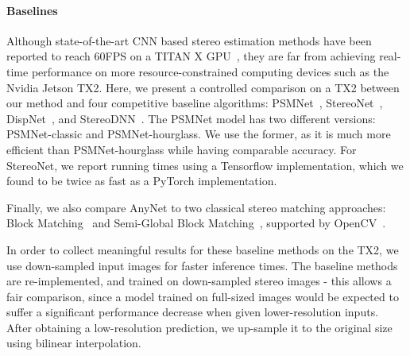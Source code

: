 \documentclass[letterpaper, 10 pt, conference]{ieeeconf}
\newcommand{\nameshort}[1]{AnyNet}
\begin{document}
\paragraph{\textbf{Baselines}} 
Although state-of-the-art CNN based stereo estimation methods have been reported to reach 60FPS on a TITAN X GPU~\cite{khamis2018stereonet}, they are far from achieving real-time performance on more resource-constrained computing devices such as the Nvidia Jetson TX2.
Here, we present a controlled comparison on a TX2 between our method and four competitive baseline algorithms: PSMNet~\cite{zhao2017pyramid}, StereoNet~\cite{khamis2018stereonet}, DispNet~\cite{mayer2016large}, and StereoDNN~\cite{smolyanskiy2018importance}. The PSMNet model has two different versions: PSMNet-classic and PSMNet-hourglass. We use the former, as it is much more efficient than PSMNet-hourglass while having comparable accuracy. For StereoNet, we report running times using a Tensorflow implementation, which we found to be twice as fast as a PyTorch implementation.

Finally, we also compare \nameshort{} to two classical stereo matching approaches: Block Matching~\cite{konolige1998small} and Semi-Global Block Matching~\cite{hirschmuller2008stereo}, supported by OpenCV~\cite{bradski2000opencv}.

In order to collect meaningful results for these baseline methods on the TX2, we use down-sampled input images for faster inference times. The baseline methods are re-implemented, and trained on down-sampled stereo images - this allows a fair comparison, since a model trained on full-sized images would be expected to suffer a significant performance decrease when given lower-resolution inputs. After obtaining a low-resolution prediction, we up-sample it to the original size using bilinear interpolation.
\end{document}
